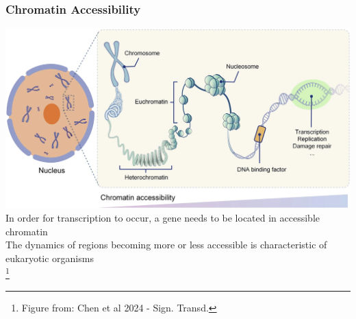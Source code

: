 \documentclass{beamer}
\newcommand\blfootnote[1]{%
	\begingroup
	\renewcommand\thefootnote{}\footnote{#1}%
	\addtocounter{footnote}{-1}%
	\endgroup
}
\begin{document}
\begin{frame}
	\frametitle{Chromatin Accessibility}
				\centering	\includegraphics[keepaspectratio, width  = \textwidth]{img/chromatinAccessibilty}\\
				In order for transcription to occur, a gene needs to be located in accessible chromatin\\
				The dynamics of regions becoming more or less accessible is characteristic of eukaryotic organisms\\
				\blfootnote{Figure from: Chen et al 2024 - Sign. Transd.}
				
			
\end{frame}
\end{document}
